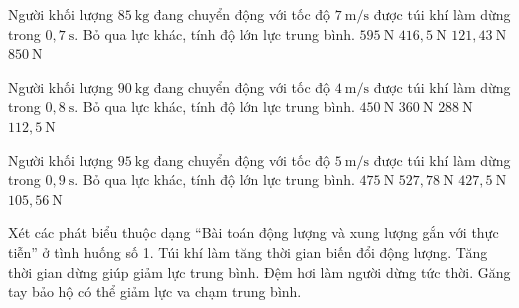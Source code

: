 \begin{ex}
Người khối lượng $85\ \mathrm{kg}$ đang chuyển động với tốc độ $7\ \mathrm{m/s}$ được túi khí làm dừng trong $0,7\ \mathrm{s}$. Bỏ qua lực khác, tính độ lớn lực trung bình.
\choice
{$595\ \mathrm{N}$}
{$416,5\ \mathrm{N}$}
{$121,43\ \mathrm{N}$}
{\True $850\ \mathrm{N}$}
\end{ex}

\begin{ex}
Người khối lượng $90\ \mathrm{kg}$ đang chuyển động với tốc độ $4\ \mathrm{m/s}$ được túi khí làm dừng trong $0,8\ \mathrm{s}$. Bỏ qua lực khác, tính độ lớn lực trung bình.
\choice
{\True $450\ \mathrm{N}$}
{$360\ \mathrm{N}$}
{$288\ \mathrm{N}$}
{$112,5\ \mathrm{N}$}
\end{ex}

\begin{ex}
Người khối lượng $95\ \mathrm{kg}$ đang chuyển động với tốc độ $5\ \mathrm{m/s}$ được túi khí làm dừng trong $0,9\ \mathrm{s}$. Bỏ qua lực khác, tính độ lớn lực trung bình.
\choice
{$475\ \mathrm{N}$}
{\True $527,78\ \mathrm{N}$}
{$427,5\ \mathrm{N}$}
{$105,56\ \mathrm{N}$}
\end{ex}

\begin{ex}
Xét các phát biểu thuộc dạng “Bài toán động lượng và xung lượng gắn với thực tiễn” ở tình huống số 1.
\choiceTF
{\True Túi khí làm tăng thời gian biến đổi động lượng.}
{\True Tăng thời gian dừng giúp giảm lực trung bình.}
{Đệm hơi làm người dừng tức thời.}
{\True Găng tay bảo hộ có thể giảm lực va chạm trung bình.}
\end{ex}

